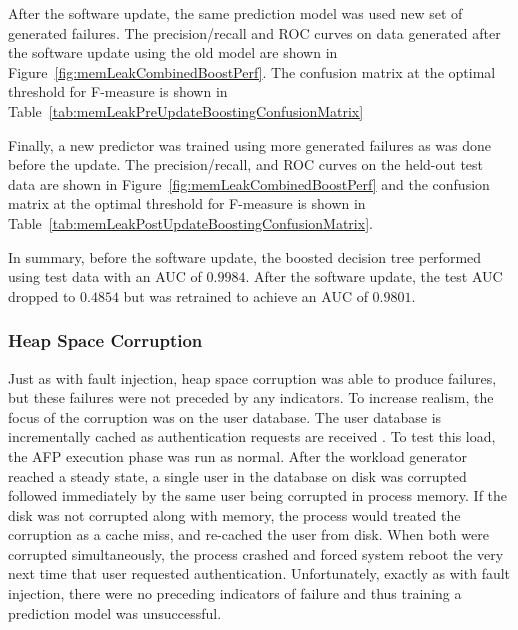 \figMemLeakCombinedBoostPerf
\tabMemLeakPreUpdateBoostingConfusionMatrix

After the software update, the same prediction model was used new set of
generated failures.  The precision/recall and \ac{ROC} curves on data generated
after the software update using the old model are shown in
Figure~\ref{fig:memLeakCombinedBoostPerf}.  The confusion matrix at
the optimal threshold for F-measure is shown in
Table~\ref{tab:memLeakPreUpdateBoostingConfusionMatrix}

\tabMemLeakPostUpdateBoostingSameModelConfusionMatrix

Finally, a new predictor was trained using more generated failures as was done
before the update.  The precision/recall, and \ac{ROC} curves on the held-out
test data are shown in Figure~\ref{fig:memLeakCombinedBoostPerf} and the
confusion matrix at the optimal threshold for F-measure is shown in
Table~\ref{tab:memLeakPostUpdateBoostingConfusionMatrix}.

\tabMemLeakPostUpdateBoostingConfusionMatrix

In summary, before the software update, the boosted decision tree performed
using test data with an \ac{AUC} of $0.9984$.  After the software update, the
test \ac{AUC} dropped to $0.4854$ but was retrained to achieve an \ac{AUC} of
$0.9801$.

\subsubsection{Heap Space Corruption}
Just as with fault injection, heap space corruption was able to produce
failures, but these failures were not preceded by any indicators.  To increase
realism, the focus of the corruption was on the user database.  The user
database is incrementally cached as authentication requests are received
\citep{russinovich2009}.  To test this load, the \ac{AFP} execution phase was
run as normal.  After the workload generator reached a steady state, a single
user in the database on disk was corrupted followed immediately by the same
user being corrupted in process memory.  If the disk was not corrupted along
with memory, the process would treated the corruption as a cache miss, and
re-cached the user from disk.  When both were corrupted simultaneously, the
process crashed and forced system reboot the very next time that user requested
authentication.  Unfortunately, exactly as with fault injection, there were no
preceding indicators of failure and thus training a prediction model was
unsuccessful.

